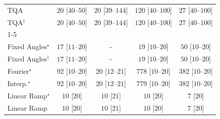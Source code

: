 \begin{tabular}{l|cccc|}
TQA & {\cellcolor[HTML]{F5FBF2}} \color[HTML]{000000} $20$ [$40$--$50$] & {\cellcolor[HTML]{F5FBF2}} \color[HTML]{000000} $20$ [$39$--$144$] & {\cellcolor[HTML]{E0F3DB}} \color[HTML]{000000} $120$ [$40$--$100$] & {\cellcolor[HTML]{F4FBF1}} \color[HTML]{000000} $27$ [$40$--$100$] \\
TQA$^\dagger$ & {\cellcolor[HTML]{F5FBF2}} \color[HTML]{000000} $20$ [$40$--$50$] & {\cellcolor[HTML]{F5FBF2}} \color[HTML]{000000} $20$ [$39$--$144$] & {\cellcolor[HTML]{E0F3DB}} \color[HTML]{000000} $120$ [$40$--$100$] & {\cellcolor[HTML]{F4FBF1}} \color[HTML]{000000} $27$ [$40$--$100$] \\
\cline{1-5}
\multicolumn{5}{c}{\rule{0pt}{8pt}SV} \\
\midrule
Fixed Angles$^\star$ & {\cellcolor[HTML]{F5FBF3}} \color[HTML]{000000} $17$ [$11$--$20$] & {\cellcolor[HTML]{000000}} \color[HTML]{F1F1F1} {\cellcolor{white}} \color{black} - & {\cellcolor[HTML]{F5FBF3}} \color[HTML]{000000} $19$ [$10$--$20$] & {\cellcolor[HTML]{EFF9EC}} \color[HTML]{000000} $50$ [$10$--$20$] \\
Fixed Angles$^\dagger$ & {\cellcolor[HTML]{F5FBF3}} \color[HTML]{000000} $17$ [$11$--$20$] & {\cellcolor[HTML]{000000}} \color[HTML]{F1F1F1} {\cellcolor{white}} \color{black} - & {\cellcolor[HTML]{F5FBF3}} \color[HTML]{000000} $19$ [$10$--$20$] & {\cellcolor[HTML]{EFF9EC}} \color[HTML]{000000} $50$ [$10$--$20$] \\
Fourier$^\star$ & {\cellcolor[HTML]{E7F6E3}} \color[HTML]{000000} $92$ [$10$--$20$] & {\cellcolor[HTML]{F5FBF2}} \color[HTML]{000000} $20$ [$12$--$21$] & {\cellcolor[HTML]{00441B}} \color[HTML]{F1F1F1} $778$ [$10$--$20$] & {\cellcolor[HTML]{79C67A}} \color[HTML]{000000} $382$ [$10$--$20$] \\
Interp.$^\star$ & {\cellcolor[HTML]{E7F6E3}} \color[HTML]{000000} $92$ [$10$--$20$] & {\cellcolor[HTML]{F5FBF2}} \color[HTML]{000000} $20$ [$12$--$21$] & {\cellcolor[HTML]{00441B}} \color[HTML]{F1F1F1} $779$ [$10$--$20$] & {\cellcolor[HTML]{79C67A}} \color[HTML]{000000} $382$ [$10$--$20$] \\
Linear Ramp$^\star$ & {\cellcolor[HTML]{F7FCF5}} \color[HTML]{000000} $10$ [$20$] & {\cellcolor[HTML]{F7FCF5}} \color[HTML]{000000} $10$ [$21$] & {\cellcolor[HTML]{F7FCF5}} \color[HTML]{000000} $10$ [$20$] & {\cellcolor[HTML]{F7FCF5}} \color[HTML]{000000} $7$ [$20$] \\
Linear Ramp & {\cellcolor[HTML]{F7FCF5}} \color[HTML]{000000} $10$ [$20$] & {\cellcolor[HTML]{F7FCF5}} \color[HTML]{000000} $10$ [$21$] & {\cellcolor[HTML]{F7FCF5}} \color[HTML]{000000} $10$ [$20$] & {\cellcolor[HTML]{F7FCF5}} \color[HTML]{000000} $7$ [$20$] \\

\end{tabular}
